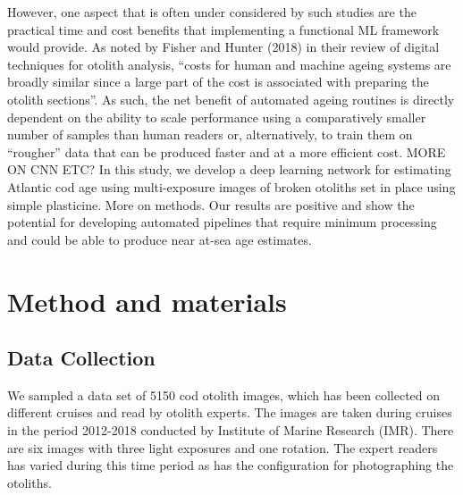 \documentclass[10pt,letterpaper]{article}
\begin{document}
However, one aspect that is often under considered by such studies are the practical time and cost benefits that implementing a functional ML framework would provide. As noted by Fisher and Hunter (2018) in their review of digital techniques for otolith analysis, “costs for human and machine ageing systems are broadly similar since a large part of the cost is associated with preparing the otolith sections”. As such, the net benefit of automated ageing routines is directly dependent on the ability to scale performance using a comparatively smaller number of samples than human readers or, alternatively, to train them on “rougher” data that can be produced faster and at a more efficient cost.
MORE ON CNN ETC?
In this study, we develop a deep learning network for estimating Atlantic cod age using multi-exposure images of broken otoliths set in place using simple plasticine. More on methods. Our results are positive and show the potential for developing automated pipelines that require minimum processing and could be able to produce near at-sea age estimates.


\section*{Method and materials}

\subsection*{Data Collection}

We sampled a data set of  5150 cod otolith images, which has been collected 
on different cruises and read by otolith experts. The images are taken during
cruises in the period 2012-2018 conducted by Institute of Marine Research (IMR).
There are six images with three light exposures and one rotation.
The expert readers has varied during this time period as has the configuration
for photographing the otoliths. 
\end{document}
